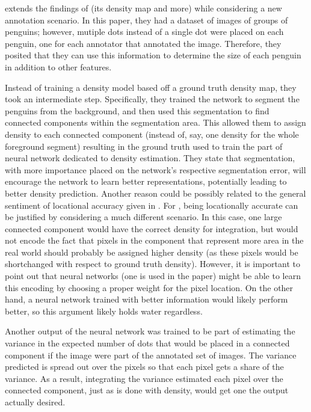 \cite{Arteta16} extends the findings of \cite{learningtocount} (its density map and more) while
considering a new annotation scenario. In this paper, they had a dataset of images of groups of
penguins; however, mutiple dots instead of a single dot were placed on each penguin, one for each
annotator that annotated the image. Therefore, they posited that they can use this information to
determine the size of each penguin in addition to other features.

Instead of training a density model based off a ground truth density map, they took an intermediate
step. Specifically, they trained the network to segment the penguins from the background, and then
used this segmentation to find connected components within the segmentation area. This allowed them
to assign density to each connected component (instead of, say, one density for the whole foreground
segment) resulting in the ground truth used to train the part of neural network dedicated to density
estimation. They state that segmentation, with more importance placed on the network's respective
segmentation error, will encourage the network to learn better representations, potentially leading
to better density prediction. Another reason could be possibly related to the general sentiment of
locational accuracy given in \cite{learningtocount}. For \cite{Arteta16}, being locationally
accurate can be justified by considering a much different scenario. In this case, one large
connected component would have the correct density for integration, but would not encode the fact
that pixels in the component that represent more area in the real world should probably be assigned
higher density (as these pixels would be shortchanged with respect to ground truth density).
However, it is important to point out that neural networks (one is used in the paper) might be able
to learn this encoding by choosing a proper weight for the pixel location. On the other hand, a
neural network trained with better information would likely perform better, so this argument likely
holds water regardless.

Another output of the neural network was trained to be part of estimating the variance in the
expected number of dots that would be placed in a connected component if the image were part of the
annotated set of images. The variance predicted is spread out over the pixels so that each pixel
gets a share of the variance. As a result, integrating the variance estimated each pixel over the
connected component, just as is done with density, would get one the output actually desired.

